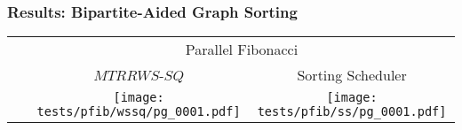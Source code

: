 \begin{slide}
\frametitle{Results: Bipartite-Aided Graph Sorting}

    \begin{table}
    \centering
    \begin{tabular}{@{}ccc}
        & \multicolumn{2}{c}{Parallel Fibonacci} \\ \cline{2-3}
        & $MTRRWS$-$SQ$ & Sorting Scheduler  \\ \cline{2-3} 
        \multicolumn{1}{c|}{~}  & 
        \multicolumn{1}{c|}{\texttt{[image: tests/pfib/wssq/pg\_0001.pdf]}} & 
        \multicolumn{1}{c|}{\texttt{[image: tests/pfib/ss/pg\_0001.pdf]}} \\ \cline{2-3}
    \end{tabular}
    \label{tab:ss-compare-fib}
    \end{table}

\end{slide}

